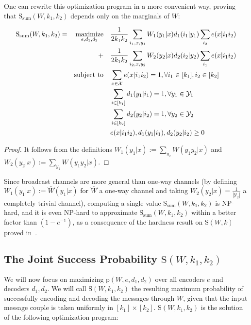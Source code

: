 One can rewrite this optimization program in a more convenient way, proving that $\mathrm{S}_{\text{sum}}(W,k_1,k_2)$ depends only on the marginals of $W$:
\begin{prop}
  \begin{equation}
  \begin{aligned}
    \mathrm{S}_{\text{sum}}(W,k_1,k_2) = &&\underset{e,d_1,d_2}{\operatorname{\text{maximize}}} &&& \frac{1}{2k_1k_2}\sum_{i_1,x,y_1} W_1(y_1|x)d_1(i_1|y_1)\sum_{i_2} e(x|i_1i_2)\\
    &&+&&& \frac{1}{2k_1k_2}\sum_{i_2,x,y_2} W_2(y_2|x)d_2(i_2|y_2)\sum_{i_1} e(x|i_1i_2)\\
    &&\operatorname{\text{subject to}} &&& \sum_{x \in \mathcal{X}} e(x|i_1i_2) = 1, \forall i_1 \in [k_1], i_2 \in [k_2]\\
    &&&&& \sum_{i \in [k_1]} d_1(y_1|i_1) = 1, \forall y_1 \in \mathcal{Y}_1\\
    &&&&& \sum_{i \in [k_2]} d_2(y_2|i_2) = 1, \forall y_2 \in \mathcal{Y}_2\\
    &&&&& e(x|i_1i_2), d_1(y_1|i_1), d_2(y_2|i_2) \geq 0
  \end{aligned}
  \end{equation}
\end{prop}

\begin{proof}
  It follows from the definitions $W_1(y_1|x) := \sum_{y_2} W(y_1y_2|x)$ and $W_2(y_2|x) := \sum_{y_1} W(y_1y_2|x)$.
\end{proof}


Since broadcast channels are more general than one-way channels (by defining $W_1(y_1|x):=\hat{W}(y_1|x)$ for $\hat{W}$ a one-way channel and taking $W_2(y_2|x)=\frac{1}{|\mathcal{Y}_2|}$ a completely trivial channel), computing a single value $\mathrm{S}_{\text{sum}}(W,k_1,k_2)$ is \textrm{NP}-hard, and it is even \textrm{NP}-hard to approximate $\mathrm{S}_{\text{sum}}(W,k_1,k_2)$ within a better factor than $\left(1-e^{-1}\right)$, as a consequence of the hardness result on $\mathrm{S}(W,k)$ proved in~\cite{BF18}.

\subsection{The Joint Success Probability $\mathrm{S}(W,k_1,k_2)$}
We will now focus on maximizing $\mathrm{p}(W,e,d_1,d_2)$ over all encoders $e$ and decoders $d_1,d_2$. We will call $\mathrm{S}(W,k_1,k_2)$ the resulting maximum probability of successfully encoding and decoding the messages through $W$, given that the input message couple is taken uniformly in $[k_1] \times [k_2]$. $\mathrm{S}(W,k_1,k_2)$ is the solution of the following optimization program:

